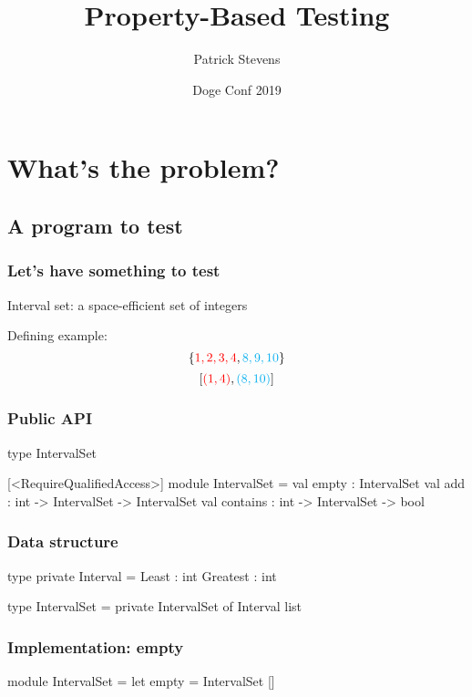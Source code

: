 \documentclass{beamer}
\title{Property-Based Testing}
\author{Patrick Stevens}
\institute{G-Research}
\date{Doge Conf 2019}
\begin{document}
\begin{frame}
\titlepage
\end{frame}

\section{What's the problem?}
\subsection{A program to test}

\begin{frame}
\tableofcontents
\end{frame}

\begin{frame}
\frametitle{Let's have something to test}
Interval set: a space-efficient set of integers

Defining example:
$$\{{\color{red}1,2,3,4},{\color{cyan}8,9,10}\}$$ $$[{\color{red}(1, 4)}, {\color{cyan}(8, 10)}]$$
\end{frame}

\begin{frame}[fragile]
\frametitle{Public API}
\begin{fslisting}
type IntervalSet

[<RequireQualifiedAccess>]
module IntervalSet =
    val empty : IntervalSet
    val add : int -> IntervalSet -> IntervalSet
    val contains : int -> IntervalSet -> bool
\end{fslisting}

\end{frame}

\begin{frame}[fragile]
\frametitle{Data structure}

\begin{fslisting}
type private Interval =
    {
        Least : int
        Greatest : int
    }

type IntervalSet = private IntervalSet of Interval list

\end{fslisting}
\end{frame}

\begin{frame}[fragile]
\frametitle{Implementation: empty}

\begin{fslisting}
[<RequireQualifiedAccess>]
module IntervalSet =
    let empty = IntervalSet []

\end{fslisting}
\end{frame}
\end{document}
